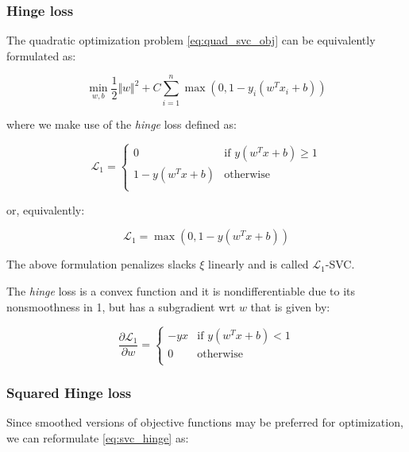 \subsubsection{Hinge loss}

The quadratic optimization problem \ref{eq:quad_svc_obj} can be equivalently formulated as: 

\begin{equation} \label{eq:svc_hinge}
    \min_{w,b} \frac{1}{2} \Vert w \Vert^2 + C \sum_{i=1}^n \max(0, 1 - y_i (w^T x_i + b))
\end{equation}

where we make use of the \emph{hinge} loss defined as:

\begin{equation} \label{eq:hinge_loss1}
	\mathcal{L}_1 = 
	\begin{cases}
		0 & \text{if } y (w^T x + b) \geq 1 \\
		1 - y (w^T x + b) & \text{otherwise} \\
	\end{cases}
\end{equation}

or, equivalently:

\begin{equation} \label{eq:hinge_loss2}
	\mathcal{L}_1 = \max(0, 1 - y (w^T x + b))
\end{equation}

The above formulation penalizes slacks $\xi$ linearly and is called $\mathcal{L}_1$-SVC.

The \emph{hinge} loss is a convex function and it is nondifferentiable due to its nonsmoothness in 1, but has a subgradient wrt $w$ that is given by:

\begin{equation} \label{eq:hinge_loss_der}
    \frac{\partial \mathcal{L}_1}{\partial w}=
        \begin{cases}
            -y x & \text{if } y (w^T x + b) < 1 \\
            0 & \text{otherwise} \\ 
        \end{cases}
\end{equation}

\subsubsection{Squared Hinge loss}

Since smoothed versions of objective functions may be preferred for optimization, we can reformulate \ref{eq:svc_hinge} as:

